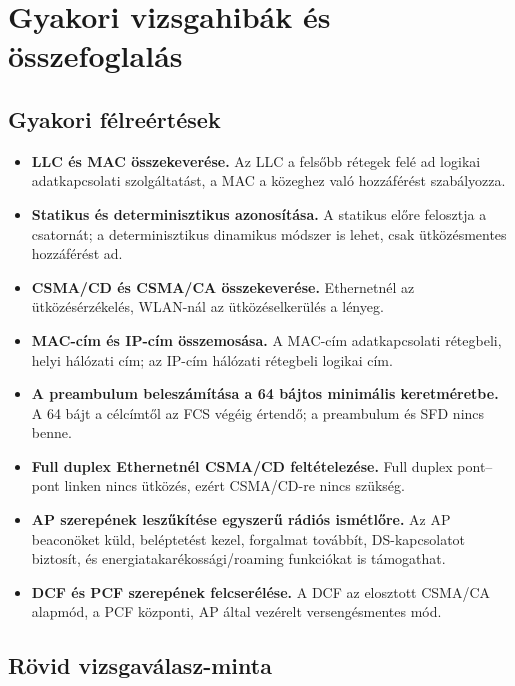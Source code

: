 \section{Gyakori vizsgahibák és összefoglalás}

\subsection{Gyakori félreértések}

\begin{itemize}
  \item \textbf{LLC és MAC összekeverése.} Az LLC a felsőbb rétegek felé ad logikai adatkapcsolati szolgáltatást, a MAC a közeghez való hozzáférést szabályozza.
  \item \textbf{Statikus és determinisztikus azonosítása.} A statikus előre felosztja a csatornát; a determinisztikus dinamikus módszer is lehet, csak ütközésmentes hozzáférést ad.
  \item \textbf{CSMA/CD és CSMA/CA összekeverése.} Ethernetnél az ütközésérzékelés, WLAN-nál az ütközéselkerülés a lényeg.
  \item \textbf{MAC-cím és IP-cím összemosása.} A MAC-cím adatkapcsolati rétegbeli, helyi hálózati cím; az IP-cím hálózati rétegbeli logikai cím.
  \item \textbf{A preambulum beleszámítása a 64 bájtos minimális keretméretbe.} A 64 bájt a célcímtől az FCS végéig értendő; a preambulum és SFD nincs benne.
  \item \textbf{Full duplex Ethernetnél CSMA/CD feltételezése.} Full duplex pont--pont linken nincs ütközés, ezért CSMA/CD-re nincs szükség.
  \item \textbf{AP szerepének leszűkítése egyszerű rádiós ismétlőre.} Az AP beaconöket küld, beléptetést kezel, forgalmat továbbít, DS-kapcsolatot biztosít, és energiatakarékossági/roaming funkciókat is támogathat.
  \item \textbf{DCF és PCF szerepének felcserélése.} A DCF az elosztott CSMA/CA alapmód, a PCF központi, AP által vezérelt versengésmentes mód.
\end{itemize}

\subsection{Rövid vizsgaválasz-minta}

